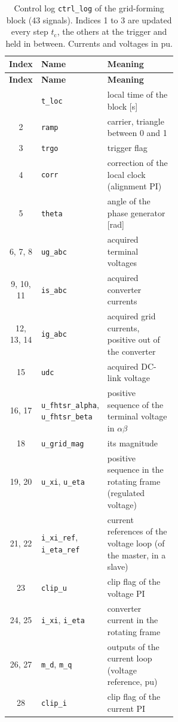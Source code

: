 \documentclass[11pt,a4paper]{scrartcl}
\newcommand{\ped}[1]{_{\mathrm{#1}}}
\newcommand{\code}[1]{\texttt{#1}}
\begin{document}
\begin{onehalfspace}
\begingroup
{}
\small
\begin{longtable}{@{} c l p{0.56\linewidth} @{}}
	\caption[Control log of the grid-forming block.]{Control log \code{ctrl\_log} of the grid-forming block (43 signals). Indices 1 to 3 are updated every step $t\ped{c}$, the others at the trigger and held in between. Currents and voltages in pu.} \label{tab:log_gfm} \\
	\toprule
	\textbf{Index} & \textbf{Name} & \textbf{Meaning} \\
	\midrule
	\endfirsthead
	\toprule
	\textbf{Index} & \textbf{Name} & \textbf{Meaning} \\
	\midrule
	\endhead
	\bottomrule
	\endfoot
	\bottomrule
	\endlastfoot
	1 & \code{t\_loc} & local time of the block [\si{\second}] \\
	2 & \code{ramp} & carrier, triangle between 0 and 1 \\
	3 & \code{trgo} & trigger flag \\
	4 & \code{corr} & correction of the local clock (alignment PI) \\
	5 & \code{theta} & angle of the phase generator [\si{\radian}] \\
	6, 7, 8 & \code{ug\_abc} & acquired terminal voltages \\
	9, 10, 11 & \code{is\_abc} & acquired converter currents \\
	12, 13, 14 & \code{ig\_abc} & acquired grid currents, positive out of the converter \\
	15 & \code{udc} & acquired DC-link voltage \\
	16, 17 & \code{u\_fhtsr\_alpha}, \code{u\_fhtsr\_beta} & positive sequence of the terminal voltage in $\alpha\beta$ \\
	18 & \code{u\_grid\_mag} & its magnitude \\
	19, 20 & \code{u\_xi}, \code{u\_eta} & positive sequence in the rotating frame (regulated voltage) \\
	21, 22 & \code{i\_xi\_ref}, \code{i\_eta\_ref} & current references of the voltage loop (of the master, in a slave) \\
	23 & \code{clip\_u} & clip flag of the voltage PI \\
	24, 25 & \code{i\_xi}, \code{i\_eta} & converter current in the rotating frame \\
	26, 27 & \code{m\_d}, \code{m\_q} & outputs of the current loop (voltage reference, pu) \\
	28 & \code{clip\_i} & clip flag of the current PI \\

\end{longtable}
\end{onehalfspace}
\end{document}
